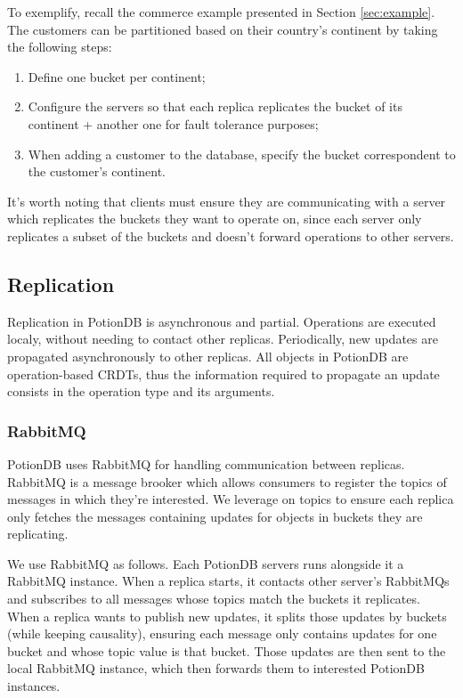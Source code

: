 \documentclass{vldb}
\begin{document}
To exemplify, recall the commerce example presented in Section \ref{sec:example}.
The customers can be partitioned based on their country's continent by taking the following steps: 

\begin{enumerate}
	\item Define one bucket per continent;
	\item Configure the servers so that each replica replicates the bucket of its continent + another one for fault tolerance purposes;
	\item When adding a customer to the database, specify the bucket correspondent to the customer's continent.
\end{enumerate}

It's worth noting that clients must ensure they are communicating with a server which replicates the buckets they want to operate on, since each server only replicates a subset of the buckets and doesn't forward operations to other servers.

\subsection{Replication}

Replication in PotionDB is asynchronous and partial.
Operations are executed localy, without needing to contact other replicas.
Periodically, new updates are propagated asynchronously to other replicas.
All objects in PotionDB are operation-based CRDTs, thus the information required to propagate an update consists in the operation type and its arguments.

\subsubsection{RabbitMQ}

PotionDB uses RabbitMQ \cite{???} for handling communication between replicas.
RabbitMQ is a message brooker which allows consumers to register the topics of messages in which they're interested.
We leverage on topics to ensure each replica only fetches the messages containing updates for objects in buckets they are replicating.

We use RabbitMQ as follows.
Each PotionDB servers runs alongside it a RabbitMQ instance.
When a replica starts, it contacts other server's RabbitMQs and subscribes to all messages whose topics match the buckets it replicates.
When a replica wants to publish new updates, it splits those updates by buckets (while keeping causality), ensuring each message only contains updates for one bucket and whose topic value is that bucket.
Those updates are then sent to the local RabbitMQ instance, which then forwards them to interested PotionDB instances.
\end{document}
